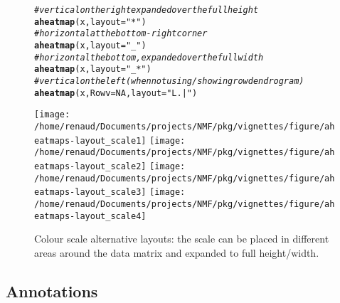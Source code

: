 \documentclass[a4paper]{article}\usepackage[]{graphicx}\usepackage[]{color}
\makeatletter
\newcommand{\hlnum}[1]{\textcolor[rgb]{0.686,0.059,0.569}{#1}}%
\newcommand{\hlstr}[1]{\textcolor[rgb]{0.192,0.494,0.8}{#1}}%
\newcommand{\hlcom}[1]{\textcolor[rgb]{0.678,0.584,0.686}{\textit{#1}}}%
\newcommand{\hlstd}[1]{\textcolor[rgb]{0.345,0.345,0.345}{#1}}%
\newcommand{\hlkwc}[1]{\textcolor[rgb]{0.333,0.667,0.333}{#1}}%
\newcommand{\hlkwd}[1]{\textcolor[rgb]{0.737,0.353,0.396}{\textbf{#1}}}%
\newenvironment{kframe}{%
 \def\at@end@of@kframe{}%
 \ifinner\ifhmode%
  \def\at@end@of@kframe{\end{minipage}}%
  \begin{minipage}{\columnwidth}%
 \fi\fi%
 \def\FrameCommand##1{\hskip\@totalleftmargin \hskip-\fboxsep
 \colorbox{shadecolor}{##1}\hskip-\fboxsep
     \hskip-\linewidth \hskip-\@totalleftmargin \hskip\columnwidth}%
 \MakeFramed {\advance\hsize-\width
   \@totalleftmargin\z@ \linewidth\hsize
   \@setminipage}}%
 {\par\unskip\endMakeFramed%
 \at@end@of@kframe}
\newenvironment{knitrout}{}{} %
\makeatother
\begin{document}
\begin{figure}[h!]
\begin{knitrout}\small
{}\color{fgcolor}\begin{kframe}
\begin{alltt}
\hlcom{# vertical on the right expanded over the full height}
\hlkwd{aheatmap}\hlstd{(x,} \hlkwc{layout} \hlstd{=} \hlstr{"*"}\hlstd{)}
\hlcom{# horizontal at the bottom-right corner}
\hlkwd{aheatmap}\hlstd{(x,} \hlkwc{layout} \hlstd{=} \hlstr{"_"}\hlstd{)}
\hlcom{# horizontal the bottom, expanded over the full width}
\hlkwd{aheatmap}\hlstd{(x,} \hlkwc{layout} \hlstd{=} \hlstr{"_*"}\hlstd{)}
\hlcom{# vertical on the left (when not using/showing row dendrogram)}
\hlkwd{aheatmap}\hlstd{(x,} \hlkwc{Rowv} \hlstd{=} \hlnum{NA}\hlstd{,} \hlkwc{layout} \hlstd{=} \hlstr{"L.|"}\hlstd{)}
\end{alltt}
\end{kframe}
\texttt{[image: /home/renaud/Documents/projects/NMF/pkg/vignettes/figure/aheatmaps-layout\_scale1]} 
\texttt{[image: /home/renaud/Documents/projects/NMF/pkg/vignettes/figure/aheatmaps-layout\_scale2]} 
\texttt{[image: /home/renaud/Documents/projects/NMF/pkg/vignettes/figure/aheatmaps-layout\_scale3]} 
\texttt{[image: /home/renaud/Documents/projects/NMF/pkg/vignettes/figure/aheatmaps-layout\_scale4]} 

\end{knitrout}

\caption{Colour scale alternative layouts: the scale can be placed in different
areas around the data matrix and expanded to full height/width.}
\label{fig:layout_scale}
\end{figure}


\subsection{Annotations}
\end{document}

